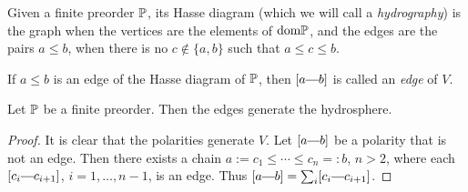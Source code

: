 \begin{definition}
	Given a finite preorder $\mathbb{P}$, its Hasse diagram (which we will call a \textit{hydrography}) is the graph when the vertices are the elements of $\text{dom} \mathbb{P}$, and the edges are the pairs $a \leq b$, when there is no $c \notin \{a, b\}$ such that $a \leq c \leq b$.
\end{definition}
	If $a \leq b$ is an edge of the Hasse diagram of $\mathbb{P}$, then $[a \connect b]$ is called an \textit{edge} of $V$.
\begin{prop}
	Let $\mathbb{P}$ be a finite preorder. Then the edges generate the hydrosphere.
\end{prop}
\begin{proof}
	It is clear that the polarities generate $V$. Let $[a \connect b]$ be a polarity that is not an edge. Then there exists a chain $a := c_1 \leq  \cdots \leq c_n =: b$, $n > 2$, where each $[c_i \connect c_{i+1}]$, $i = 1, \dots, n-1$, is an edge. Thus $[a \connect b] = \sum_i [c_i \connect c_{i+1}]$.
\end{proof}
